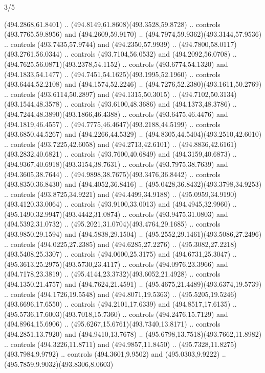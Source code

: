 \begin{flagdescription}{3/5}
\begin{scope}[xshift=0.5\flaglength,yshift=0.5\flagwidth,scale=\flagwidth/99]
\begin{scope}[y=0.8pt, x=0.8pt, yscale=-0.20628, xscale=0.20628,shift={(-500,-300)}]
\begin{scope}[cm={{0.79646,0.0,0.0,0.7753,(100.0721,273.79617)}}]
\begin{scope}[cm={{1.1028,0.0,0.0,1.08434,(-41.46868,-11.26981)}}]
  (494.2868,61.8401) .. (494.8149,61.8608)(493.3528,59.8728) .. controls
  (493.7765,59.8956) and (494.2609,59.9170) ..
  (494.7974,59.9362)(493.3144,57.9536) .. controls (493.7435,57.9744) and
  (494.2350,57.9939) .. (494.7800,58.0117)(493.2761,56.0344) .. controls
  (493.7104,56.0532) and (494.2092,56.0708) ..
  (494.7625,56.0871)(493.2378,54.1152) .. controls (493.6774,54.1320) and
  (494.1833,54.1477) .. (494.7451,54.1625)(493.1995,52.1960) .. controls
  (493.6444,52.2108) and (494.1574,52.2246) ..
  (494.7276,52.2380)(493.1611,50.2769) .. controls (493.6114,50.2897) and
  (494.1315,50.3015) .. (494.7102,50.3134)(493.1544,48.3578) .. controls
  (493.6100,48.3686) and (494.1373,48.3786) ..
  (494.7244,48.3890)(493.1866,46.4388) .. controls (493.6475,46.4476) and
  (494.1819,46.4557) .. (494.7775,46.4647)(493.2188,44.5199) .. controls
  (493.6850,44.5267) and (494.2266,44.5329) ..
  (494.8305,44.5404)(493.2510,42.6010) .. controls (493.7225,42.6058) and
  (494.2713,42.6101) .. (494.8836,42.6161)(493.2832,40.6821) .. controls
  (493.7600,40.6849) and (494.3159,40.6873) ..
  (494.9367,40.6918)(493.3154,38.7631) .. controls (493.7975,38.7639) and
  (494.3605,38.7644) .. (494.9898,38.7675)(493.3476,36.8442) .. controls
  (493.8350,36.8430) and (494.4052,36.8416) ..
  (495.0428,36.8432)(493.3798,34.9253) .. controls (493.8725,34.9221) and
  (494.4499,34.9188) .. (495.0959,34.9190)(493.4120,33.0064) .. controls
  (493.9100,33.0013) and (494.4945,32.9960) ..
  (495.1490,32.9947)(493.4442,31.0874) .. controls (493.9475,31.0803) and
  (494.5392,31.0732) .. (495.2021,31.0704)(493.4764,29.1685) .. controls
  (493.9850,29.1594) and (494.5838,29.1504) ..
  (495.2552,29.1461)(493.5086,27.2496) .. controls (494.0225,27.2385) and
  (494.6285,27.2276) .. (495.3082,27.2218)(493.5408,25.3307) .. controls
  (494.0600,25.3175) and (494.6731,25.3047) ..
  (495.3613,25.2975)(493.5730,23.4117) .. controls (494.0976,23.3966) and
  (494.7178,23.3819) .. (495.4144,23.3732)(493.6052,21.4928) .. controls
  (494.1350,21.4757) and (494.7624,21.4591) ..
  (495.4675,21.4489)(493.6374,19.5739) .. controls (494.1726,19.5548) and
  (494.8071,19.5363) .. (495.5205,19.5246)(493.6696,17.6550) .. controls
  (494.2101,17.6339) and (494.8517,17.6135) ..
  (495.5736,17.6003)(493.7018,15.7360) .. controls (494.2476,15.7129) and
  (494.8964,15.6906) .. (495.6267,15.6761)(493.7340,13.8171) .. controls
  (494.2851,13.7920) and (494.9410,13.7678) ..
  (495.6798,13.7518)(493.7662,11.8982) .. controls (494.3226,11.8711) and
  (494.9857,11.8450) .. (495.7328,11.8275)(493.7984,9.9792) .. controls
  (494.3601,9.9502) and (495.0303,9.9222) .. (495.7859,9.9032)(493.8306,8.0603)

\end{scope}
\end{scope}
\end{scope}
\end{scope}
\end{flagdescription}
